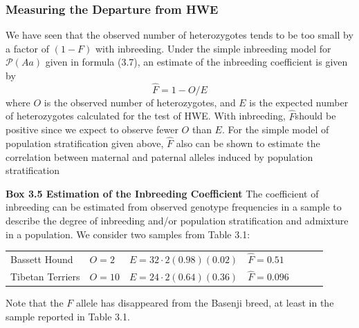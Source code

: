 \documentclass[a4paper,twoside,11pt]{article}
\begin{document}
\subsubsection{Measuring the Departure from HWE}
We have seen that the observed number of heterozygotes tends to be too small by a factor of $(1-F)$ with inbreeding. Under the simple inbreeding model for $\mathcal{P}(Aa)$ given in formula (3.7), an estimate of the inbreeding coefficient is given by
$$
\hat{F}= 1-O/E
$$
where $O$ is the observed number of heterozygotes, and $E$ is the expected number of heterozygotes calculated for the test of HWE. With inbreeding, $\hat{F}$should be positive since we expect to observe fewer $O$ than $E$. For the simple model of population stratification given above, $\hat{F}$ also can be shown to estimate the correlation between maternal and paternal alleles induced by population stratification
\begin{shaded*}
\noindent \textbf{Box 3.5 Estimation of the Inbreeding Coefficient}
\newline
\newline
The coefficient of inbreeding can be estimated from observed genotype frequencies in a sample to describe the degree of inbreeding and/or population stratification and admixture in a population. We consider two samples from Table 3.1:
\begin{center}
\centering
\begin{tabularx}{1.0\textwidth} { 
  | >{\centeringt\arraybackslash}X 
   >{\centering\arraybackslash}X
   >{\centering\arraybackslash}X
   >{\centering\arraybackslash}X 
  | >{\centering\arraybackslash}X
  | >{\centering\arraybackslash}X 
  | >{\centering\arraybackslash}X | }
\hline
Bassett Hound & $O=2$ & $E=32 \cdot 2(0.98)(0.02)$ & $\hat{F}=0.51$  \\
Tibetan Terriers & $O=10$ & $E=24 \cdot 2(0.64)(0.36)$ & $\hat{F}=0.096$ \\
\hline
\end{tabularx}
\end{center}
Note that the $F$ allele has disappeared from the Basenji breed, at least in the sample reported in Table 3.1.
\end{shaded*}
\end{document}
